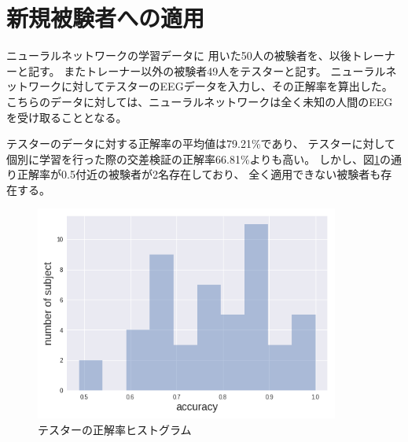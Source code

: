 
\section{\mc 新規被験者への適用}
ニューラルネットワークの学習データに
用いた50人の被験者を、以後トレーナーと記す。
またトレーナー以外の被験者49人をテスターと記す。
ニューラルネットワークに対してテスターのEEGデータを入力し、その正解率を算出した。
こちらのデータに対しては、ニューラルネットワークは全く未知の人間のEEGを受け取ることとなる。

テスターのデータに対する正解率の平均値は79.21\%であり、
テスターに対して個別に学習を行った際の交差検証の正解率66.81\%よりも高い。
しかし、図\ref{fig:tesacc}の通り正解率が0.5付近の被験者が2名存在しており、
全く適用できない被験者も存在する。
\begin{figure}[p]
    \centering
    \includegraphics[width=10cm]{images/tester_acc.png}
    \caption{テスターの正解率ヒストグラム}
    \label{fig:tesacc}
\end{figure}

